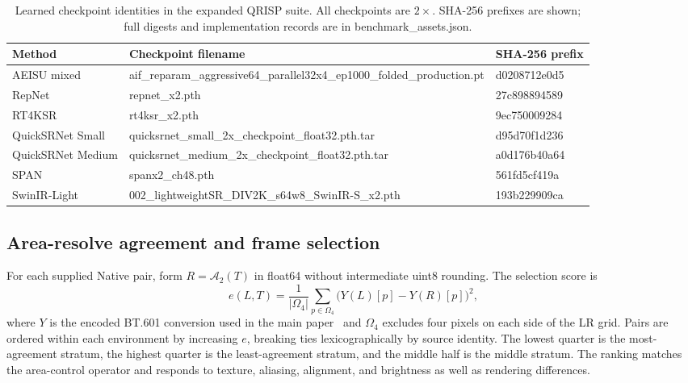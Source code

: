 \documentclass[10pt,twocolumn,letterpaper]{article}
\newcommand{\A}{\mathcal{A}}
\begin{document}
\begin{table}[t]
\centering\small
\caption{Learned checkpoint identities in the expanded QRISP suite. All checkpoints are $2\times$. SHA-256 prefixes are shown; full digests and implementation records are in \textnormal{benchmark\_assets.json}.}
\label{tab:checkpoint-identities}
\begin{tabularx}{\textwidth}{lYl}
\toprule
Method & Checkpoint filename & SHA-256 prefix\\
\midrule
AEISU mixed & {\footnotesize\textnormal{aif\_\allowbreak{}reparam\_\allowbreak{}aggressive64\_\allowbreak{}parallel32x4\_\allowbreak{}ep1000\_\allowbreak{}folded\_\allowbreak{}production.\allowbreak{}pt}} & {\footnotesize\textnormal{d0208712e0d5}} \\
RepNet & {\footnotesize\textnormal{repnet\_\allowbreak{}x2.\allowbreak{}pth}} & {\footnotesize\textnormal{27c898894589}} \\
RT4KSR & {\footnotesize\textnormal{rt4ksr\_\allowbreak{}x2.\allowbreak{}pth}} & {\footnotesize\textnormal{9ec750009284}} \\
QuickSRNet Small & {\footnotesize\textnormal{quicksrnet\_\allowbreak{}small\_\allowbreak{}2x\_\allowbreak{}checkpoint\_\allowbreak{}float32.\allowbreak{}pth.\allowbreak{}tar}} & {\footnotesize\textnormal{d95d70f1d236}} \\
QuickSRNet Medium & {\footnotesize\textnormal{quicksrnet\_\allowbreak{}medium\_\allowbreak{}2x\_\allowbreak{}checkpoint\_\allowbreak{}float32.\allowbreak{}pth.\allowbreak{}tar}} & {\footnotesize\textnormal{a0d176b40a64}} \\
SPAN & {\footnotesize\textnormal{spanx2\_\allowbreak{}ch48.\allowbreak{}pth}} & {\footnotesize\textnormal{561fd5cf419a}} \\
SwinIR-Light & {\footnotesize\textnormal{002\_\allowbreak{}lightweightSR\_\allowbreak{}DIV2K\_\allowbreak{}s64w8\_\allowbreak{}SwinIR-\allowbreak{}S\_\allowbreak{}x2.\allowbreak{}pth}} & {\footnotesize\textnormal{193b229909ca}} \\
\bottomrule
\end{tabularx}
\end{table}

\subsection{Area-resolve agreement and frame selection}
For each supplied Native pair, form $R=\A_2(T)$ in float64 without intermediate uint8 rounding.
The selection score is
\begin{equation}
 e(L,T)=\frac{1}{|\Omega_4|}\sum_{p\in\Omega_4}
       \big(Y(L)[p]-Y(R)[p]\big)^2,
\end{equation}
where $Y$ is the encoded BT.601 conversion used in the main paper~\cite{basicsrmetrics} and $\Omega_4$ excludes four pixels on each side of the LR grid.
Pairs are ordered within each environment by increasing $e$, breaking ties lexicographically by source identity.
The lowest quarter is the most-agreement stratum, the highest quarter is the least-agreement stratum, and the middle half is the middle stratum.
The ranking matches the area-control operator and responds to texture, aliasing, alignment, and brightness as well as rendering differences.
\end{document}
